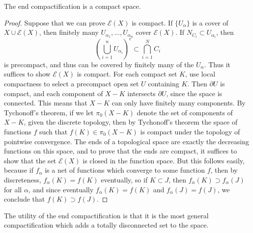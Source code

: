 \begin{lemma}
    The end compactification is a compact space.
\end{lemma}
\begin{proof}
    Suppose that we can prove $\mathcal{E}(X)$ is compact. If $\{ U_\alpha \}$ is a cover of $X \cup \mathcal{E}(X)$, then finitely many $U_{\alpha_1}, \dots, U_{\alpha_n}$ cover $\mathcal{E}(X)$. If $N_{C_i} \subset U_{\alpha_i}$, then
    \[ \left( \bigcup_{i = 1}^n U_{\alpha_i} \right)^c \subset \bigcap_{i = 1}^N C_i \]
    is precompact, and thus can be covered by finitely many of the $U_\alpha$. Thus it suffices to show $\mathcal{E}(X)$ is compact. For each compact set $K$, use local compactness to select a precompact open set $U$ containing $K$. Then $\partial U$ is compact, and each component of $X - K$ intersects $\partial U$, since the space is connected. This means that $X - K$ can only have finitely many components. By Tychonoff's theorem, if we let $\pi_0(X - K)$ denote the set of components of $X - K$, given the discrete topology, then by Tychonoff's theorem the space of functions $f$ such that $f(K) \in \pi_0(X-K)$ is compact under the topology of pointwise convergence. The ends of a topological space are exactly the decreasing functions on this space, and to prove that the ends are compact, it suffices to show that the set $\mathcal{E}(X)$ is closed in the function space. But this follows easily, because if $f_\alpha$ is a net of functions which converge to some function $f$, then by discreteness, $f_\alpha(K) = f(K)$ eventually, so if $K \subset J$, then $f_\alpha(K) \supset f_\alpha(J)$ for all $\alpha$, and since eventually $f_\alpha(K) = f(K)$ and $f_\alpha(J) = f(J)$, we conclude that $f(K) \supset f(J)$.
\end{proof}

The utility of the end compactification is that it is the most general compactification which adds a totally disconnected set to the space. 

